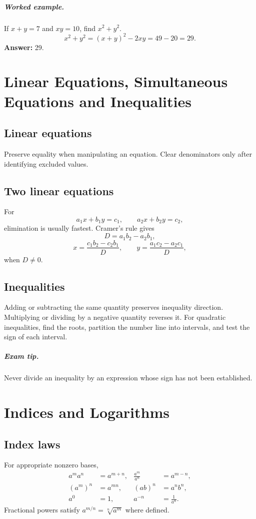 \documentclass[12pt,a4paper,oneside]{book}
\newcommand{\ans}[1]{\textbf{Answer:} #1}
\newcommand{\tip}[1]{\paragraph{Exam tip.} #1}
\newcommand{\q}[2]{\paragraph{#1} #2}
\begin{document}
\q{Worked example.}{If \(x+y=7\) and \(xy=10\), find \(x^2+y^2\).}
\[x^2+y^2=(x+y)^2-2xy=49-20=29.\]
\ans{29.}

\chapter[Equations and Inequalities]{Linear Equations, Simultaneous Equations and Inequalities}
\section{Linear equations}
Preserve equality when manipulating an equation. Clear denominators only after identifying excluded values.

\section{Two linear equations}
For
\[a_1x+b_1y=c_1,\qquad a_2x+b_2y=c_2,\]
elimination is usually fastest. Cramer's rule gives
\[D=a_1b_2-a_2b_1,\]
\[x=\frac{c_1b_2-c_2b_1}{D},\qquad y=\frac{a_1c_2-a_2c_1}{D},\]
when \(D\ne0\).

\section{Inequalities}
Adding or subtracting the same quantity preserves inequality direction. Multiplying or dividing by a negative quantity reverses it.
For quadratic inequalities, find the roots, partition the number line into intervals, and test the sign of each interval.

\tip{Never divide an inequality by an expression whose sign has not been established.}

\chapter[Indices and Logarithms]{Indices and Logarithms}
\section{Index laws}
For appropriate nonzero bases,
\begin{align*}
a^ma^n&=a^{m+n},&\frac{a^m}{a^n}&=a^{m-n},\\
(a^m)^n&=a^{mn},&(ab)^n&=a^nb^n,\\
a^0&=1,&a^{-n}&=\frac1{a^n}.
\end{align*}
Fractional powers satisfy \(a^{m/n}=\sqrt[n]{a^m}\) where defined.
\end{document}
